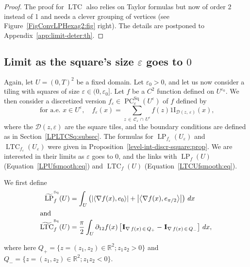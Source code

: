 \documentclass[AHL,Unicode,longabstracts,published]{cedram}
\newcommand{\R}{\mathbb{R}}
\newcommand{\ind}{{1\!\!\mathrm{I}}}
\newcommand{\eps}{\varepsilon}
\DeclareMathOperator{\LTC}{LTC}
\DeclareMathOperator{\LP}{LP}
\DeclareMathOperator{\PC}{PC}
\DeclareMathOperator{\Sq}{Sq}
\newcommand{\tLP}{\widetilde{\mathrm{LP}}}
\newcommand{\tLTC}{\widetilde{\mathrm{LTC}}}
\newcommand{\calC}{\mathcal{C}}
\newcommand{\calD}{\mathcal{D}}
\begin{document}
\begin{proof}

The proof for $\LTC$ also relies on Taylor formulas but now of order 2 instead of 1 and needs a clever grouping of vertices (see Figure~\ref{FigConvLPHexag2:fig} right). The details are postponed to Appendix~\ref{app:limit-deter:th}.
\end{proof}

\subsection{Limit as the square's size \texorpdfstring{$\eps$}{eps} goes to \texorpdfstring{$0$}{0}}

Again, let $U=(0,T)^2$ be a fixed domain. Let $\eps_0>0$, and let us now consider a tiling with squares of size $\eps \in (0,\eps_0]$. Let $f$ be a $C^2$ function defined on $U^{\eps_0}$. We then consider a discretized version $f_\eps\in \PC^{\Sq}_\eps(U^{\eps})$ of $f$ defined by
\begin{equation}\label{disc:sq}
\text{ for a.e. } x\in U^{\eps}, \quad f_\varepsilon(x) =\sum_{z\,\in\,\calC_\eps\,\cap\,U^{\eps}} f(z)
\ind_{\calD(z,\,\eps)}(x),
\end{equation}
where the $\calD(z,\eps)$ are the square tiles, and the boundary conditions are defined as in Section~\ref{LPLTCSq:subsec}. The formulas for $\LP_{f_\eps}(U_\eps)$ and $\LTC_{f_\eps}(U_\eps)$ were given in Proposition~\ref{level-int-discr-square:prop}. We are interested in their limits as $\eps$ goes to $0$, and the links with $\LP_f (U)$ (Equation~\eqref{LPUfsmooth:eq}) and $\LTC_f (U)$ (Equation~\eqref{LTCUfsmooth:eq}).

We first define
\begin{align}
\tLP_{f}^{^{\Sq}}(U) &= \int_U \left(\left|\left\langle
\nabla f(x),e_0\right\rangle\right| +\left|\left\langle \nabla f(x),e_{\pi/2}\right\rangle\right| \right) \, dx\label{LPSq}\\
\intertext{and}
\tLTC_{f}^{^{\Sq}}(U) &= \frac{\pi}{2}\int_U \partial_{12}f(x) \left[\ind_{\nabla\,f(x)\,\in\,Q_+}-\ind_{\nabla\,f(x)\,\in\,Q_-}\right] \, dx,\label{LTCSq}
\end{align}

where here $Q_+=\{z=(z_1,z_2)\in\R^2; z_1z_2>0\}$ and $Q_-=\{z=(z_1,z_2)\in\R^2; z_1z_2<0\}$.
\end{document}
